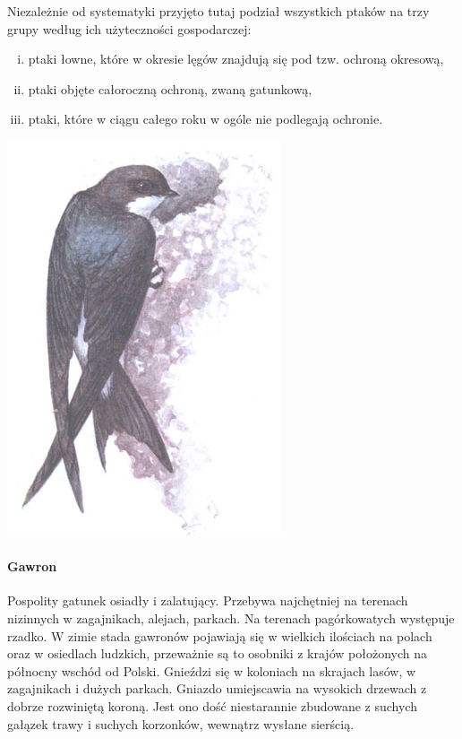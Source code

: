 \documentclass[a4paper,12pt,twoside]{article}
\begin{document}
\begin{minipage}{8cm}
Niezależnie od systematyki przyjęto tutaj podział wszystkich ptaków na trzy grupy według ich użyteczności gospodarczej:
\begin{enumerate}[i)]
\item ptaki łowne, które w okresie lęgów znajdują się pod tzw. ochroną okresową,
\item ptaki objęte całoroczną ochroną, zwaną gatunkową,
\item ptaki, które w ciągu całego roku w ogóle nie podlegają ochronie.
\end{enumerate}
\end{minipage}
%
\hspace{5mm}
%
\begin{minipage}{7cm}
\centerline{\includegraphics[scale=0.35]{jaskolka-oknowka}}
\end{minipage}

\newpage


\paragraph{Gawron} Pospolity gatunek osiadły i zalatujący. Przebywa najchętniej na terenach nizinnych w zagajnikach, alejach, parkach. Na terenach pagórkowatych występuje rzadko. W zimie stada gawronów pojawiają się w wielkich ilościach na polach oraz w osiedlach ludzkich, przeważnie są to osobniki z krajów położonych na północny wschód od Polski. Gnieździ się w koloniach na skrajach lasów, w zagajnikach i dużych parkach. Gniazdo umiejscawia na wysokich drzewach z dobrze rozwiniętą koroną. Jest ono dość niestarannie zbudowane z suchych gałązek trawy i suchych korzonków, wewnątrz wysłane sierścią.
\end{document}
